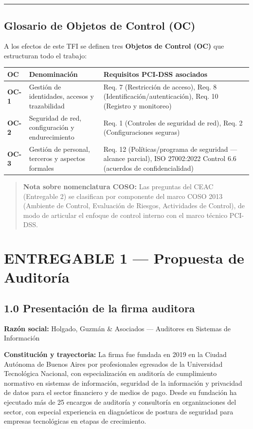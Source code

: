 \documentclass[11pt,a4paper]{article}
\begin{document}
\noindent\rule{\linewidth}{0.4pt}

\subsection{Glosario de Objetos de Control (OC)}

A los efectos de este TFI se definen tres \textbf{Objetos de Control (OC)} que estructuran todo el trabajo:

\begin{tabularx}{\textwidth}{P{3cm}P{4cm}L}
\toprule
\textbf{OC} & \textbf{Denominación} & \textbf{Requisitos PCI-DSS asociados} \\
\midrule
\textbf{OC-1} & Gestión de identidades, accesos y trazabilidad & Req. 7 (Restricción de acceso), Req. 8 (Identificación/autenticación), Req. 10 (Registro y monitoreo) \\
\textbf{OC-2} & Seguridad de red, configuración y endurecimiento & Req. 1 (Controles de seguridad de red), Req. 2 (Configuraciones seguras) \\
\textbf{OC-3} & Gestión de personal, terceros y aspectos formales & Req. 12 (Políticas/programa de seguridad — alcance parcial), ISO 27002:2022 Control 6.6 (acuerdos de confidencialidad) \\
\bottomrule
\end{tabularx}

\begin{quote}
\textbf{Nota sobre nomenclatura COSO:} Las preguntas del CEAC (Entregable 2) se clasifican por componente del marco COSO 2013 (Ambiente de Control, Evaluación de Riesgos, Actividades de Control), de modo de articular el enfoque de control interno con el marco técnico PCI-DSS.
\end{quote}

\clearpage

\section{ENTREGABLE 1 — Propuesta de Auditoría}

\subsection{1.0 Presentación de la firma auditora}

\textbf{Razón social:} Holgado, Guzmán \& Asociados — Auditores en Sistemas de Información

\textbf{Constitución y trayectoria:} La firma fue fundada en 2019 en la Ciudad Autónoma de Buenos Aires por profesionales egresados de la Universidad Tecnológica Nacional, con especialización en auditoría de cumplimiento normativo en sistemas de información, seguridad de la información y privacidad de datos para el sector financiero y de medios de pago. Desde su fundación ha ejecutado más de 25 encargos de auditoría y consultoría en organizaciones del sector, con especial experiencia en diagnósticos de postura de seguridad para empresas tecnológicas en etapas de crecimiento.
\end{document}

